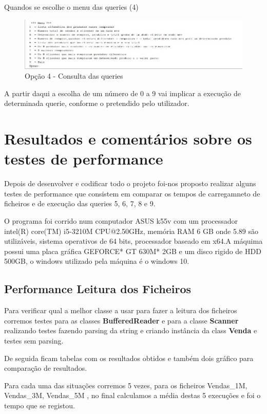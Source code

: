 Quandos se escolhe o menu das queries (4) 
\begin{figure}[h!]
	\includegraphics[scale=0.9]{ConsultasIterativas}  
	\caption{Opção 4 - Consulta das queries }  
\end{figure}

A partir daqui a escolha de um número de 0 a 9 vai implicar a execução de determinada querie, conforme o pretendido pelo utilizador. 

\chapter{Resultados e comentários sobre os testes de performance}

Depois de desenvolver e codificar todo o projeto foi-nos proposto realizar alguns testes de performance que consistem em comparar os tempos de carregamneto de ficheiros e de execução das queries 5, 6, 7, 8 e 9.

O programa foi corrido num computador ASUS k55v com um processador intel(R) core(TM) i5-3210M CPU@2.50GHz, memória RAM 6 GB onde 5.89 são utilizáveis, sistema operativos de 64 bits, processador baseado em x64.A máquima possui uma placa gráfica GEFORCE* GT 630M* 2GB e um disco rigido de HDD 500GB, o windows utilizado pela máquina é o windows 10. 

 
\section{Performance Leitura dos Ficheiros}

\par Para verificar qual a melhor classe a usar para fazer a leitura dos ficheiros corremos testes para as classes
\color{blue} \textbf{BufferedReader} \color{black} e para a classe \color{blue} \textbf{Scanner} \color{black} realizando testes
fazendo parsing da string e criando instância da class \color{blue} \textbf{Venda} \color{black} e testes sem parsing.
\par De seguida ficam tabelas com os resultados obtidos e também dois gráfico para comparação de resultados.

Para cada uma das situações corremos 5 vezes, para os ficheiros Vendas\_1M, Vendas\_3M, Vendas\_5M , no final calculamos a média destas 5 execuções e foi o tempo que se registou.

